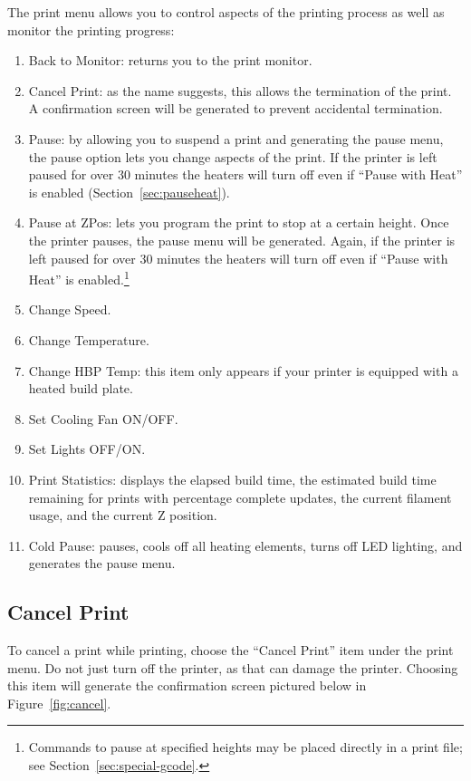 The print menu allows you to control aspects of the printing process as well as monitor the printing progress:
\begin{enumerate}
\item Back to Monitor: returns you to the print monitor.
\item Cancel Print: as the name suggests, this allows the termination of the print.  A confirmation screen will be generated to prevent accidental termination.
\item Pause: by allowing you to suspend a print and generating the pause menu, the pause option lets you change aspects of the print.  If the printer is left paused for over 30 minutes the heaters will turn off even if ``Pause with Heat'' is enabled (Section~\ref{sec:pauseheat}).
\item Pause at ZPos: lets you program the print to stop at a certain height.  Once the printer pauses, the pause menu will be generated.  Again, if the printer is left paused for over 30 minutes the heaters will turn off even if ``Pause with Heat'' is enabled.\footnote{Commands to pause at specified heights may be placed directly in a print file; see Section~\ref{sec:special-gcode}.}
\item Change Speed.
\item Change Temperature.
\item Change HBP Temp: this item only appears if your printer is equipped with a heated build plate. 
\item Set Cooling Fan ON/OFF.
\item Set Lights OFF/ON.
\item Print Statistics: displays the elapsed build time, the estimated build time remaining for prints with percentage complete updates, the current filament usage, and the current Z position. 
\item Cold Pause: pauses, cools off all heating elements, turns off LED lighting, and generates the pause menu.
\end{enumerate}


\subsection{Cancel Print}\label{sec:cancel}

To cancel a print while printing, choose the ``Cancel Print'' item under the print menu.  Do not just turn off the printer, as that can damage the printer.  Choosing this item will generate the confirmation screen pictured below in Figure~\ref{fig:cancel}.

